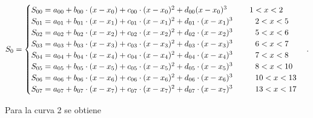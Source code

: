 \begin{equation}
        S_0 =
        \begin{cases}
            S_{00} = a_{00} + b_{00}\cdot (x-x_0) + c_{00} \cdot (x-x_0)^2 + d_{00} (x-x_0)^3 \hspace{10mm} 1 <x< 2 \\
            S_{01} = a_{01} + b_{01} \cdot (x-x_1) + c_{01} \cdot (x-x_1)^2 + d_{01} \cdot (x-x_1)^3 \hspace{10mm} 2<x<5 \\
            S_{02} = a_{02} + b_{02} \cdot (x-x_2) + c_{02} \cdot (x-x_2)^2 + d_{02} \cdot (x-x_2)^3 \hspace{10mm} 5<x<6 \\
            S_{03} = a_{03} + b_{03} \cdot (x-x_3) + c_{03} \cdot (x-x_3)^2 + d_{03} \cdot (x-x_3)^3 \hspace{10mm} 6<x<7 \\
            S_{04} = a_{04} + b_{04} \cdot (x-x_4) + c_{04} \cdot (x-x_4)^2 + d_{04} \cdot (x-x_4)^3 \hspace{10mm} 7<x<8 \\
            S_{05} = a_{05} + b_{05} \cdot (x-x_5) + c_{05} \cdot (x-x_5)^2 + d_{05} \cdot (x-x_5)^3 \hspace{10mm} 8<x<10 \\
            S_{06} = a_{06} + b_{06} \cdot (x-x_6) + c_{06} \cdot (x-x_6)^2 + d_{06} \cdot (x-x_6)^3 \hspace{10mm} 10<x<13 \\
            S_{07} = a_{07} + b_{07} \cdot (x-x_7) + c_{07} \cdot (x-x_7)^2 + d_{07} \cdot (x-x_7)^3 \hspace{10mm} 13<x<17 \\
        \end{cases}.
\end{equation}

Para la curva 2 se obtiene

